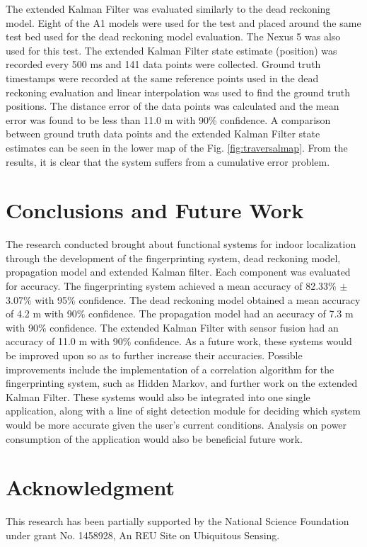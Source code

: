 \documentclass[conference]{IEEEtran}
\begin{document}
The extended Kalman Filter was evaluated similarly to the dead reckoning model. Eight of the A1 models were used for the test and placed around the same test bed used for the dead reckoning model evaluation. The Nexus 5 was also used for this test. The extended Kalman Filter state estimate (position) was recorded every 500 ms and 141 data points were collected. Ground truth timestamps were recorded at the same reference points used in the dead reckoning evaluation and linear interpolation was used to find the ground truth positions. The distance error of the data points was calculated and the mean error was found to be less than 11.0 m with 90\% confidence. A comparison between ground truth data points and the extended Kalman Filter state estimates can be seen in the lower map of the Fig. \ref{fig:traversalmap}. From the results, it is clear that the system suffers from a cumulative error problem.


\section{Conclusions and Future Work}

The research conducted brought about functional systems for indoor localization through the development of the fingerprinting system, dead reckoning model, propagation model and extended Kalman filter. Each component was evaluated for accuracy. The fingerprinting system achieved a mean accuracy of 82.33\% $\pm$ 3.07\% with 95\% confidence. The dead reckoning model obtained a mean accuracy of 4.2 m with 90\% confidence. The propagation model had an accuracy of 7.3 m with 90\% confidence. The extended Kalman Filter with sensor fusion had an accuracy of 11.0 m with 90\% confidence. As a future work, these systems would be improved upon so as to further increase their accuracies. Possible improvements include the implementation of a correlation algorithm for the fingerprinting system, such as Hidden Markov, and further work on the extended Kalman Filter. These systems would also be integrated into one single application, along with a line of sight detection module for deciding which system would be more accurate given the user’s current conditions. Analysis on power consumption of the application would also be beneficial future work.


\section*{Acknowledgment}
This research has been partially supported by the National Science Foundation under grant No. 1458928, An REU Site on Ubiquitous Sensing.




\end{document}
